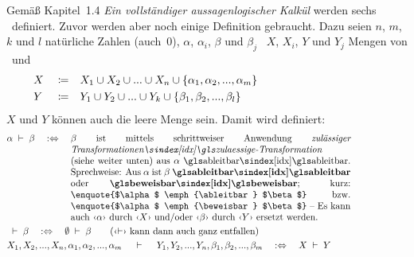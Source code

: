 Gemäß \cite{bib:Rautenberg} Kapitel~1.4 \emph{Ein vollständiger aussagenlogischer Kalkül} werden sechs \Basisregeln\ definiert. Zuvor werden aber noch einige Definition gebraucht. Dazu seien $n$, $m$, $k$ und $l$ natürliche Zahlen (auch~0), $\alpha$, $\alpha_i$, $\beta$ und $\beta_j$ \Formeln\, $X$, $X_i$, $Y$ und $Y_j$ Mengen von \Formeln\ und
\begin{align}
	&X&&\coloneqq&&X_1\cup X_2\cup...\cup X_n\cup\{\alpha_1,\alpha_2,...,\alpha_m\}
	\\
	&Y&&\coloneqq&&Y_1\cup Y_2\cup...\cup Y_k\cup\{\beta_1, \beta_2, ...,\beta_l \}
	&&&&&&&&&&&&&&&&&&&&
\end{align}
%
$X$ und $Y$ können auch die leere Menge sein. Damit wird definiert:
\begin{align}
	& \alpha \derive \beta \quad \metadefeq \quad
	\parbox[t]{10.5cm}{%
	$\beta$ ist mittels schrittweiser Anwendung \emph{\glsIdxBg{zulaessige-Transformation}{zulässiger Transformationen}} (siehe weiter unten) aus $\alpha$ \ableitbar.
	Sprechweise: Aus $\alpha$ ist $\beta$ \defn{\ableitbar} oder \defn{\beweisbar};
	kurz: \enquote{$\alpha$ \emph{\ableitbar} $\beta$} \textbzw\ \enquote{$\alpha$ \emph{\beweisbar} $\beta$}
	-- Es kann auch \chrqt{$\alpha$} durch \chrqt{$X$} und/oder \chrqt{$\beta$} durch \chrqt{$Y$} ersetzt werden.
	}
	\label{def:ableitbar}
	\\
	& \derive \beta \quad \metadefeq \quad \emptyset \derive \beta \qquad \text{(\chrqt{$\derivesym$} kann dann auch ganz entfallen)}
	\\
	&             X_1, X_2, ...,X_n, \alpha_1, \alpha_2, ..., \alpha_m \quad
	\derive \quad Y_1, Y_2, ...,Y_n,  \beta_1,  \beta_2,  ..., \beta_m \quad
	\metadefeq \quad X \derive Y
	\label{def:ableitbarKurz}
	\formulatoleft
\end{align}
%

